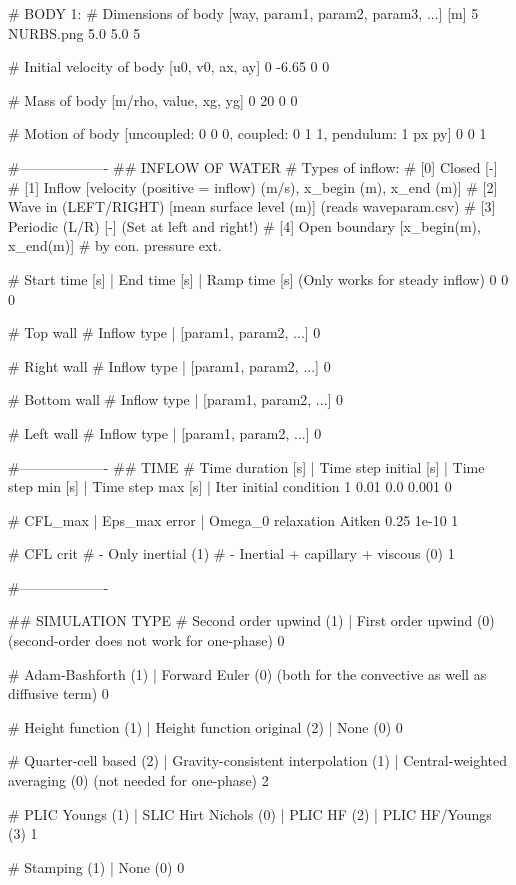 # BODY 1:
# Dimensions of body [way, param1, param2, param3, ...] [m]
5 NURBS.png 5.0 5.0 5

# Initial velocity of body [u0, v0, ax, ay]
0 -6.65 0 0

# Mass of body [m/rho, value, xg, yg]
0 20 0 0

# Motion of body [uncoupled: 0 0 0, coupled: 0 1 1, pendulum: 1 px py]
0 0 1

#-------------------
## INFLOW OF WATER
# Types of inflow:
# [0] Closed                [-]
# [1] Inflow                [velocity (positive = inflow) (m/s), x_begin (m), x_end (m)]
# [2] Wave in (LEFT/RIGHT)  [mean surface level (m)] (reads waveparam.csv)
# [3] Periodic (L/R)        [-] (Set at left and right!)
# [4] Open boundary         [x_begin(m), x_end(m)]
#     by con. pressure ext.

# Start time [s] | End time [s] | Ramp time [s] (Only works for steady inflow)
0 0 0

# Top wall
# Inflow type | [param1, param2, ...]
0

# Right wall
# Inflow type | [param1, param2, ...]
0

# Bottom wall
# Inflow type | [param1, param2, ...]
0

# Left wall
# Inflow type | [param1, param2, ...]
0

#-------------------
## TIME
# Time duration [s]	| Time step initial [s]		| Time step min [s]	| Time step max [s] | Iter initial condition
1 0.01 0.0 0.001 0

# CFL_max | Eps_max error | Omega_0 relaxation Aitken
0.25		1e-10	        1

# CFL crit
# - Only inertial (1)
# - Inertial + capillary + viscous (0)
1

#-------------------

## SIMULATION TYPE
# Second order upwind (1)	| First order upwind (0) (second-order does not work for one-phase)
0

# Adam-Bashforth (1)	| Forward Euler (0) (both for the convective as well as diffusive term)
0

# Height function (1)	| Height function original (2) | None (0)
0

# Quarter-cell based (2) | Gravity-consistent interpolation (1)	|	Central-weighted averaging (0) (not needed for one-phase)
2

# PLIC Youngs (1)	| SLIC Hirt Nichols (0) | PLIC HF (2) | PLIC HF/Youngs (3)
1

# Stamping (1)	| None (0)
0

